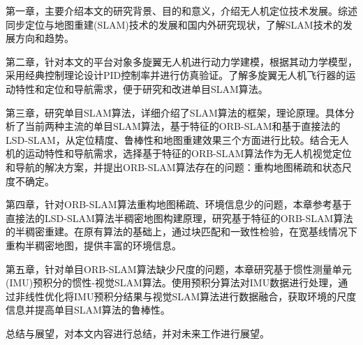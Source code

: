 第一章，主要介绍本文的研究背景、目的和意义，介绍无人机定位技术发展。综述同步定位与地图重建(SLAM)技术的发展和国内外研究现状，了解SLAM技术的发展方向和趋势。

第二章，针对本文的平台对象多旋翼无人机进行动力学建模，根据其动力学模型，采用经典控制理论设计PID控制率并进行仿真验证。了解多旋翼无人机飞行器的运动特性和定位和导航需求，便于研究和改进单目SLAM算法。

第三章，研究单目SLAM算法，详细介绍了SLAM算法的框架，理论原理。具体分析了当前两种主流的单目SLAM算法，基于特征的ORB-SLAM和基于直接法的LSD-SLAM，从定位精度、鲁棒性和地图重建效果三个方面进行比较。结合无人机的运动特性和导航需求，选择基于特征的ORB-SLAM算法作为无人机视觉定位和导航的解决方案，并提出ORB-SLAM算法存在的问题：重构地图稀疏和状态尺度不确定。

第四章，针对ORB-SLAM算法重构地图稀疏、环境信息少的问题，本章参考基于直接法的LSD-SLAM算法半稠密地图构建原理，研究基于特征的ORB-SLAM算法的半稠密重建。在原有算法的基础上，通过块匹配和一致性检验，在宽基线情况下重构半稠密地图，提供丰富的环境信息。

第五章，针对单目ORB-SLAM算法缺少尺度的问题，本章研究基于惯性测量单元(IMU)预积分的惯性-视觉SLAM算法。使用预积分算法对IMU数据进行处理，通过非线性优化将IMU预积分结果与视觉SLAM算法进行数据融合，获取环境的尺度信息并提高单目SLAM算法的鲁棒性。

总结与展望，对本文内容进行总结，并对未来工作进行展望。

